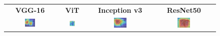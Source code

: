 \documentclass[a4paper,12pt]{report}
\begin{document}
\begin{figure}[H]
    \centering
    \setlength{\tabcolsep}{1pt}
    \begin{tabular}{cccc}
    \textbf{VGG-16} & \textbf{ViT} & \textbf{Inception v3} & \textbf{ResNet50} \\
    
    \includegraphics[width=0.22\textwidth]{images/appendix/modelgraph/vgg/correct/Glaucous_Winged_Gull/20241204_171004.jpg} &
    \includegraphics[width=0.22\textwidth]{images/appendix/modelgraph/vit/correct/Glaucous_Winged_Gull/20241204_171004.jpg} &
    \includegraphics[width=0.22\textwidth]{images/appendix/modelgraph/inception/correct/Glaucous_Winged_Gull/20241204_171004.jpg} &
    \includegraphics[width=0.22\textwidth]{images/appendix/modelgraph/resnet/correct/Glaucous_Winged_Gull/20241204_171004.jpg} \\
    \end{tabular}

    \label{fig:interpretability_glaucous_4}
\end{figure}
\end{document}
